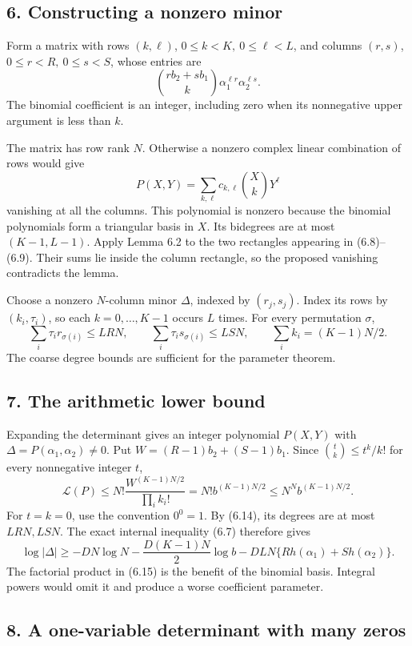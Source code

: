 \documentclass[
  11pt,
  a4paper,
]{article}
\begin{document}
\subsection{6. Constructing a nonzero
minor}\label{constructing-a-nonzero-minor}

Form a matrix with rows \((k,\ell)\), \(0\le k<K,\ 0\le\ell<L\), and
columns \((r,s)\), \(0\le r<R,\ 0\le s<S\), whose entries are \[
\binom{rb_2+sb_1}{k}\alpha_1^{\ell r}\alpha_2^{\ell s}. \tag{6.13}
\] The binomial coefficient is an integer, including zero when its
nonnegative upper argument is less than \(k\).

The matrix has row rank \(N\). Otherwise a nonzero complex linear
combination of rows would give \[
P(X,Y)=\sum_{k,\ell}c_{k,\ell}\binom Xk Y^\ell
\] vanishing at all the columns. This polynomial is nonzero because the
binomial polynomials form a triangular basis in \(X\). Its bidegrees are
at most \((K-1,L-1)\). Apply Lemma 6.2 to the two rectangles appearing
in (6.8)--(6.9). Their sums lie inside the column rectangle, so the
proposed vanishing contradicts the lemma.

Choose a nonzero \(N\)-column minor \(\Delta\), indexed by
\((r_j,s_j)\). Index its rows by \((k_i,\tau_i)\), so each
\(k=0,\ldots,K-1\) occurs \(L\) times. For every permutation \(\sigma\),
\[
\sum_i\tau_i r_{\sigma(i)}\le LRN,\qquad
\sum_i\tau_i s_{\sigma(i)}\le LSN,\qquad
\sum_i k_i=(K-1)N/2. \tag{6.14}
\] The coarse degree bounds are sufficient for the parameter theorem.

\subsection{7. The arithmetic lower
bound}\label{the-arithmetic-lower-bound}

Expanding the determinant gives an integer polynomial \(P(X,Y)\) with
\(\Delta=P(\alpha_1,\alpha_2)\ne0\). Put \(W=(R-1)b_2+(S-1)b_1\). Since
\(\binom tk\le t^k/k!\) for every nonnegative integer \(t\), \[
\mathcal L(P)\le
N!\frac{W^{(K-1)N/2}}{\prod_i k_i!}
=N!b^{(K-1)N/2}
\le N^N b^{(K-1)N/2}. \tag{6.15}
\] For \(t=k=0\), use the convention \(0^0=1\). By (6.14), its degrees
are at most \(LRN,LSN\). The exact internal inequality (6.7) therefore
gives \[
\log|\Delta|\ge
-DN\log N-\frac{D(K-1)N}{2}\log b
-DLN\{Rh(\alpha_1)+Sh(\alpha_2)\}. \tag{6.16}
\] The factorial product in (6.15) is the benefit of the binomial basis.
Integral powers would omit it and produce a worse coefficient parameter.

\subsection{8. A one-variable determinant with many
zeros}\label{a-one-variable-determinant-with-many-zeros}
\end{document}
